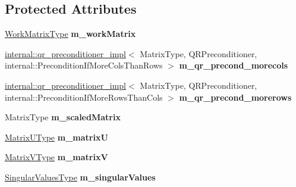 \subsection*{Protected Attributes}
\begin{DoxyCompactItemize}
\item 
\mbox{\label{class_eigen_1_1_jacobi_s_v_d_a4d68a51c9138c05942b97482cea88a37}} 
\mbox{\hyperlink{class_eigen_1_1_matrix}{Work\+Matrix\+Type}} {\bfseries m\+\_\+work\+Matrix}
\item 
\mbox{\label{class_eigen_1_1_jacobi_s_v_d_a496e62e1757d99dfb394c14be25bffb2}} 
\mbox{\hyperlink{struct_eigen_1_1internal_1_1qr__preconditioner__impl}{internal\+::qr\+\_\+preconditioner\+\_\+impl}}$<$ Matrix\+Type, Q\+R\+Preconditioner, internal\+::\+Precondition\+If\+More\+Cols\+Than\+Rows $>$ {\bfseries m\+\_\+qr\+\_\+precond\+\_\+morecols}
\item 
\mbox{\label{class_eigen_1_1_jacobi_s_v_d_ac0a41538ddc23f75c34175755813b041}} 
\mbox{\hyperlink{struct_eigen_1_1internal_1_1qr__preconditioner__impl}{internal\+::qr\+\_\+preconditioner\+\_\+impl}}$<$ Matrix\+Type, Q\+R\+Preconditioner, internal\+::\+Precondition\+If\+More\+Rows\+Than\+Cols $>$ {\bfseries m\+\_\+qr\+\_\+precond\+\_\+morerows}
\item 
\mbox{\label{class_eigen_1_1_jacobi_s_v_d_a0b861908151379c8f9002f6d56e69107}} 
Matrix\+Type {\bfseries m\+\_\+scaled\+Matrix}
\item 
\mbox{\label{class_eigen_1_1_jacobi_s_v_d_af0e0b3833c1d49286c0fdcbc023c3bd8}} 
\mbox{\hyperlink{class_eigen_1_1_matrix}{Matrix\+U\+Type}} {\bfseries m\+\_\+matrixU}
\item 
\mbox{\label{class_eigen_1_1_jacobi_s_v_d_a69cf1cfb527ff5562156c13bdca45ca5}} 
\mbox{\hyperlink{class_eigen_1_1_matrix}{Matrix\+V\+Type}} {\bfseries m\+\_\+matrixV}
\item 
\mbox{\label{class_eigen_1_1_jacobi_s_v_d_ab71e31e61c33f68ff2f499ed9f30e718}} 
\mbox{\hyperlink{struct_eigen_1_1internal_1_1true__type}{Singular\+Values\+Type}} {\bfseries m\+\_\+singular\+Values}

\end{DoxyCompactItemize}
